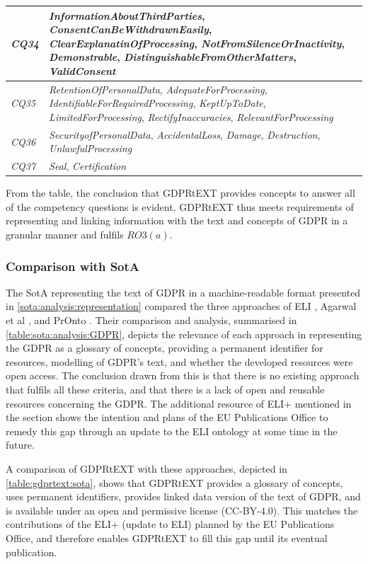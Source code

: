 \begin{table}[htbp]
\begin{tabularx}{\textwidth}{|l|X|}
\textit{CQ34} & \textit{InformationAboutThirdParties}, \textit{ConsentCanBeWithdrawnEasily}, \textit{ClearExplanatinOfProcessing}, \textit{NotFromSilenceOrInactivity}, \textit{Demonstrable}, \textit{DistinguishableFromOtherMatters}, \textit{ValidConsent} \\ \hline
\textit{CQ35} & \textit{RetentionOfPersonalData}, \textit{AdequateForProcessing}, \textit{IdentifiableForRequiredProcessing}, \textit{KeptUpToDate}, \textit{LimitedForProcessing}, \textit{RectifyInaccuracies}, \textit{RelevantForProcessing} \\ \hline
\textit{CQ36} & \textit{SecurityofPersonalData}, \textit{AccidentalLoss}, \textit{Damage}, \textit{Destruction}, \textit{UnlawfulProcessing} \\ \hline
\textit{CQ37} & \textit{Seal}, \textit{Certification} \\ \hline

\end{tabularx}
\label{table:gdprtext:eval-cq}
\end{table}
From the table, the conclusion that GDPRtEXT provides concepts to answer all of the competency questions is evident. GDPRtEXT thus meets requirements of representing and linking information with the text and concepts of GDPR in a granular manner and fulfils $RO3(a)$.

\subsubsection{Comparison with SotA}
The SotA representing the text of GDPR in a machine-readable format presented in \autoref{sota:analysis:representation} compared the three approaches of ELI \cite{}, Agarwal et al \cite{}, and PrOnto \cite{}.
Their comparison and analysis, summarised in \autoref{table:sota:analysis:GDPR}, depicts the relevance of each approach in representing the GDPR as a glossary of concepts, providing a permanent identifier for resources, modelling of GDPR's text, and whether the developed resources were open access.
The conclusion drawn from this is that there is no existing approach that fulfils all these criteria, and that there is a lack of open and reusable resources concerning the GDPR. 
The additional resource of ELI+ mentioned in the section shows the intention and plans of the EU Publications Office to remedy this gap through an update to the ELI ontology at some time in the future.

A comparison of GDPRtEXT with these approaches, depicted in \autoref{table:gdprtext:sota}, shows that GDPRtEXT provides a glossary of concepts, uses permanent identifiers, provides linked data version of the text of GDPR, and is available under an open and permissive license (CC-BY-4.0).
This matches the contributions of the ELI+ (update to ELI) planned by the EU Publications Office, and therefore enables GDPRtEXT to fill this gap until its eventual publication.

